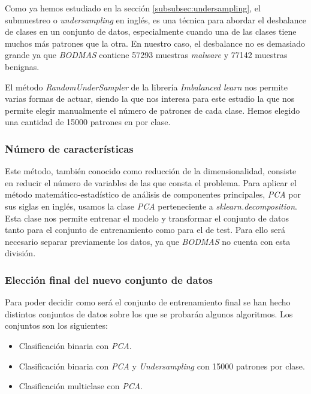 Como ya hemos estudiado en la sección \ref{subsubsec:undersampling}, el submuestreo o \textit{undersampling} en inglés, es una técnica para abordar el desbalance de clases en un conjunto de datos, especialmente cuando una de las clases tiene muchos más patrones que la otra. En nuestro caso, el desbalance no es demasiado grande ya que \textit{BODMAS} contiene 57293 muestras \textit{malware} y 77142 muestras benignas.

\vspace{1em}

El método \textit{RandomUnderSampler} \cite{randundersampler} de la librería \textit{Imbalanced learn} nos permite varias formas de actuar, siendo la que nos interesa para este estudio la que nos permite elegir manualmente el número de patrones de cada clase. Hemos elegido una cantidad de 15000 patrones en por clase.

\subsubsection{Número de características}
\label{subsubsec:num_caract}

Este método, también conocido como reducción de la dimensionalidad, consiste en reducir el número de variables de las que consta el problema. Para aplicar el método matemático-estadístico de análisis de componentes principales, \textit{PCA} por sus siglas en inglés, usamos la clase \textit{PCA} \cite{sklearn_pca} perteneciente a \textit{sklearn.decomposition}. Esta clase nos permite entrenar el modelo y transformar el conjunto de datos tanto para el conjunto de entrenamiento como para el de test. Para ello será necesario separar previamente los datos, ya que \textit{BODMAS} no cuenta con esta división.

\subsubsection{Elección final del nuevo conjunto de datos}
\label{subsubsec:eleccion_dataset}

Para poder decidir como será el conjunto de entrenamiento final se han hecho distintos conjuntos de datos sobre los que se probarán algunos algoritmos. Los conjuntos son los siguientes:

\begin{itemize}
	\item Clasificación binaria con \textit{PCA}.
	\item Clasificación binaria con \textit{PCA} y \textit{Undersampling} con 15000 patrones por clase.
	\item Clasificación multiclase con \textit{PCA}.
\end{itemize}

